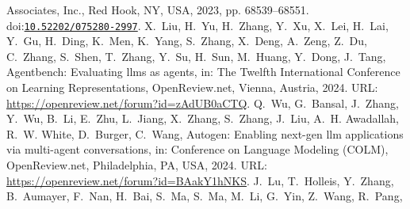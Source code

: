 \documentclass[10pt,a4paper]{article}
\providecommand{\bibinfo}[2]{#2}
\providecommand{\DOIprefix}{doi:}
\providecommand{\URLprefix}{URL: }
\providecommand{\doi}[1]{\href{https://doi.org/#1}{\nolinkurl{#1}}}
\begin{document}
\begin{thebibliography}{25}
{  Associates, Inc.}, \bibinfo{address}{Red Hook, NY, USA},
  \bibinfo{year}{2023}, pp. \bibinfo{pages}{68539--68551}.
  \DOIprefix\doi{10.52202/075280-2997}.
\bibinfo{author}{X.~Liu}, \bibinfo{author}{H.~Yu}, \bibinfo{author}{H.~Zhang},
  \bibinfo{author}{Y.~Xu}, \bibinfo{author}{X.~Lei}, \bibinfo{author}{H.~Lai},
  \bibinfo{author}{Y.~Gu}, \bibinfo{author}{H.~Ding}, \bibinfo{author}{K.~Men},
  \bibinfo{author}{K.~Yang}, \bibinfo{author}{S.~Zhang},
  \bibinfo{author}{X.~Deng}, \bibinfo{author}{A.~Zeng},
  \bibinfo{author}{Z.~Du}, \bibinfo{author}{C.~Zhang},
  \bibinfo{author}{S.~Shen}, \bibinfo{author}{T.~Zhang},
  \bibinfo{author}{Y.~Su}, \bibinfo{author}{H.~Sun},
  \bibinfo{author}{M.~Huang}, \bibinfo{author}{Y.~Dong},
  \bibinfo{author}{J.~Tang},
\newblock \bibinfo{title}{Agentbench: Evaluating llms as agents},
\newblock in: \bibinfo{booktitle}{The Twelfth International Conference on
  Learning Representations}, \bibinfo{publisher}{OpenReview.net},
  \bibinfo{address}{Vienna, Austria}, \bibinfo{year}{2024}. \URLprefix
  \url{https://openreview.net/forum?id=zAdUB0aCTQ}.
\bibinfo{author}{Q.~Wu}, \bibinfo{author}{G.~Bansal},
  \bibinfo{author}{J.~Zhang}, \bibinfo{author}{Y.~Wu}, \bibinfo{author}{B.~Li},
  \bibinfo{author}{E.~Zhu}, \bibinfo{author}{L.~Jiang},
  \bibinfo{author}{X.~Zhang}, \bibinfo{author}{S.~Zhang},
  \bibinfo{author}{J.~Liu}, \bibinfo{author}{A.~H. Awadallah},
  \bibinfo{author}{R.~W. White}, \bibinfo{author}{D.~Burger},
  \bibinfo{author}{C.~Wang},
\newblock \bibinfo{title}{Autogen: Enabling next-gen llm applications via
  multi-agent conversations},
\newblock in: \bibinfo{booktitle}{Conference on Language Modeling (COLM)},
  \bibinfo{publisher}{OpenReview.net}, \bibinfo{address}{Philadelphia, PA,
  USA}, \bibinfo{year}{2024}. \URLprefix
  \url{https://openreview.net/forum?id=BAakY1hNKS}.
\bibinfo{author}{J.~Lu}, \bibinfo{author}{T.~Holleis},
  \bibinfo{author}{Y.~Zhang}, \bibinfo{author}{B.~Aumayer},
  \bibinfo{author}{F.~Nan}, \bibinfo{author}{H.~Bai}, \bibinfo{author}{S.~Ma},
  \bibinfo{author}{S.~Ma}, \bibinfo{author}{M.~Li}, \bibinfo{author}{G.~Yin},
  \bibinfo{author}{Z.~Wang}, \bibinfo{author}{R.~Pang},

\end{thebibliography}
\end{document}

